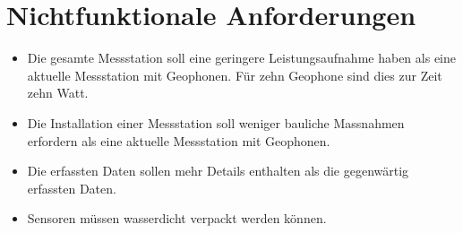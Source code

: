 %
%

\thispagestyle{empty}
\chapter{Nichtfunktionale Anforderungen}\label{chap.nichtfunktionale}

\begin{itemize}
\item Die gesamte Messstation soll eine geringere Leistungsaufnahme haben als eine aktuelle Messstation mit Geophonen. Für zehn Geophone sind dies zur Zeit zehn Watt.
\item Die Installation einer Messstation soll weniger bauliche Massnahmen erfordern als eine aktuelle Messstation mit Geophonen.
\item Die erfassten Daten sollen mehr Details enthalten als die gegenwärtig erfassten Daten.
\item Sensoren müssen wasserdicht verpackt werden können.
\
\end{itemize}
